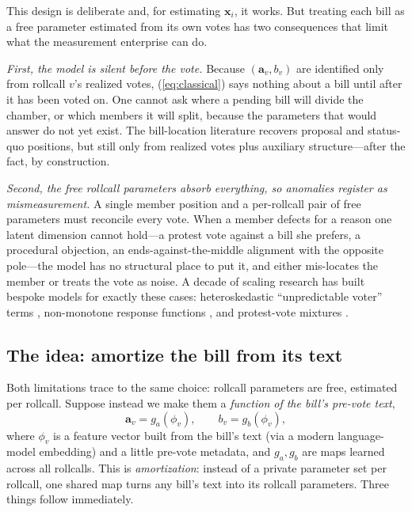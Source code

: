 \documentclass[11pt]{article}
\begin{document}
This design is deliberate and, for estimating $\mathbf{x}_i$, it
works. But treating each bill as a free parameter estimated from its
own votes has two consequences that limit what the measurement
enterprise can do.

\emph{First, the model is silent before the vote.} Because
$(\mathbf{a}_v, b_v)$ are identified only from rollcall $v$'s realized
votes, (\ref{eq:classical}) says nothing about a bill until after it
has been voted on. One cannot ask where a pending bill will divide the
chamber, or which members it will split, because the parameters that
would answer do not yet exist. The bill-location literature
\citep{peress2013estimating, richman2011parties} recovers proposal and
status-quo positions, but still only from realized votes plus
auxiliary structure---after the fact, by construction.

\emph{Second, the free rollcall parameters absorb everything, so
anomalies register as mismeasurement.} A single member position and a
per-rollcall pair of free parameters must reconcile every vote. When a
member defects for a reason one latent dimension cannot hold---a
protest vote against a bill she prefers, a procedural objection, an
ends-against-the-middle alignment with the opposite pole---the model
has no structural place to put it, and either mis-locates the member
or treats the vote as noise. A decade of scaling research has built
bespoke models for exactly these cases: heteroskedastic ``unpredictable
voter'' terms \citep{lauderdale2010unpredictable}, non-monotone
response functions \citep{duckmayr2023ends}, and protest-vote mixtures
\citep{fowler2026protest}.

\subsection{The idea: amortize the bill from its text}

Both limitations trace to the same choice: rollcall parameters are
free, estimated per rollcall. Suppose instead we make them a
\emph{function of the bill's pre-vote text},
\begin{equation}
\mathbf{a}_v = g_a(\phi_v), \qquad b_v = g_b(\phi_v),
\label{eq:amortize}
\end{equation}
where $\phi_v$ is a feature vector built from the bill's text (via a
modern language-model embedding) and a little pre-vote metadata, and
$g_a, g_b$ are maps learned across all rollcalls. This is
\emph{amortization}: instead of a private parameter set per rollcall,
one shared map turns any bill's text into its rollcall parameters.
Three things follow immediately.
\end{document}
